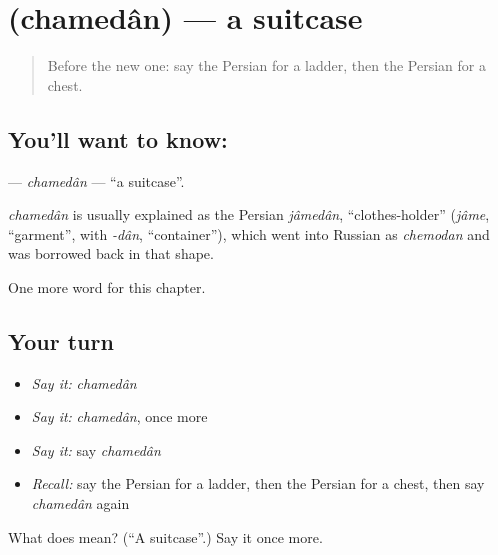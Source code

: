 \section[\texorpdfstring{\fa{چمدان} (chamedân)}{چمدان (chamedân)}]{ (chamedân) — a suitcase}

\label{lesson:FA-C112-chamedan}



\begin{quote}
Before the new one: say the Persian for a ladder, then the Persian for a chest.
\end{quote}

\subsection*{You'll want to know: }
\textbf{} — \emph{chamedân} — \textquotedblleft{}a suitcase\textquotedblright{}.

\begin{cousinweb}
\emph{chamedân} is usually explained as the Persian \emph{jâmedân}, \textquotedblleft{}clothes-holder\textquotedblright{} (\emph{jâme}, \textquotedblleft{}garment\textquotedblright{}, with \emph{-dân}, \textquotedblleft{}container\textquotedblright{}), which went into Russian as \emph{chemodan} and was borrowed back in that shape.
\end{cousinweb}

\begin{grammarlens}[title={What you've built}]
One more word for this chapter.
\end{grammarlens}

\subsection*{Your turn}
\begin{itemize}
\raggedright
  \item \emph{Say it:} \emph{chamedân}
  \item \emph{Say it:} \emph{chamedân}, once more
  \item \emph{Say it:} say \emph{chamedân}
  \item \emph{Recall:} say the Persian for a ladder, then the Persian for a chest, then say \emph{chamedân} again
\end{itemize}

\begin{tcolorbox}[breakable,colback=teal!4,colframe=teal!35!black,title={Before you move on}]
What does  mean? (\textquotedblleft{}A suitcase\textquotedblright{}.) Say it once more.
\end{tcolorbox}
